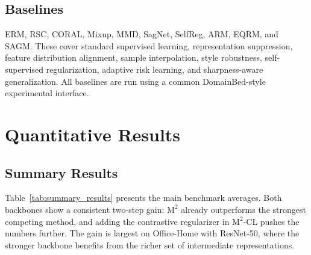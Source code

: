 \documentclass[11pt,a4paper]{article}
\newcommand{\method}{\texorpdfstring{$\mathrm{M}^2$\textup{-CL}}{M2-CL}}
\newcommand{\base}{\texorpdfstring{$\mathrm{M}^2$}{M2}}
\begin{document}
\subsection{Baselines}

ERM, RSC, CORAL, Mixup, MMD, SagNet, SelfReg, ARM, EQRM, and SAGM.  These cover
standard supervised learning, representation suppression, feature distribution
alignment, sample interpolation, style robustness, self-supervised regularization,
adaptive risk learning, and sharpness-aware generalization.  All baselines are run
using a common DomainBed-style experimental interface.

\section{Quantitative Results}

\subsection{Summary Results}

Table~\ref{tab:summary_results} presents the main benchmark averages.
Both backbones show a consistent two-step gain: \base{} already outperforms the
strongest competing method, and adding the contrastive regularizer in \method{}
pushes the numbers further.  The gain is largest on Office-Home with ResNet-50,
where the stronger backbone benefits from the richer set of intermediate
representations.
\end{document}
